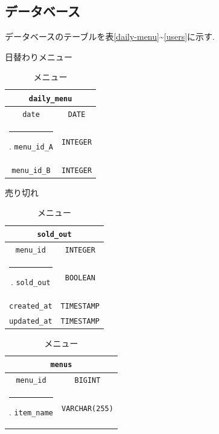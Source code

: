 \documentclass[a4paper]{ltjsarticle}
\makeatletter
\def\Hline{
    \noalign{\ifnum0=`}\fi\hrule \@height 3.\arrayrulewidth \futurelet
    \reserved@a\@xhline}
\makeatother
\begin{document}
    \subsection{データベース}
        データベースのテーブルを表\ref{daily-menu}\sim\ref{users}に示す.
    \clearpage
        \begin{table}[h]
            \begin{minipage}[t]{.49\textwidth}
                \center
                \caption{日替わりメニュー}
                \label{daily-menu}
                \begin{tabular}{|c|c|}
                    \hline
                    \multicolumn{2}{|c|}{\texttt{daily\_menu}} \\ \hline \hline
                    \verb|date| & \verb|DATE| \\ \Hline
                    \verb|menu_id_A| & \verb|INTEGER| \\ \hline
                    \verb|menu_id_B| & \verb|INTEGER| \\ \hline
                \end{tabular}
                \center
                \caption{売り切れ}
                \label{soldout}
                \begin{tabular}{|c|c|}
                    \hline
                    \multicolumn{2}{|c|}{\texttt{sold\_out}} \\ \hline \hline
                    \verb|menu_id| & \verb|INTEGER| \\ \Hline
                    \verb|sold_out| & \verb|BOOLEAN| \\ \hline
                    \verb|created_at| & \verb|TIMESTAMP| \\ \hline
                    \verb|updated_at| & \verb|TIMESTAMP| \\ \hline
                \end{tabular}
            \end{minipage}
            \begin{minipage}[t]{.49\textwidth}
                \center
                \caption{メニュー}
                \label{menu}
                \begin{tabular}{|c|c|}
                    \hline
                    \multicolumn{2}{|c|}{\texttt{menus}} \\ \hline \hline
                    \verb|menu_id| & \verb|BIGINT| \\ \Hline
                    \verb|item_name| & \verb|VARCHAR(255)| \\ \hline

\end{tabular}
\end{minipage}
\end{table}
\end{document}
